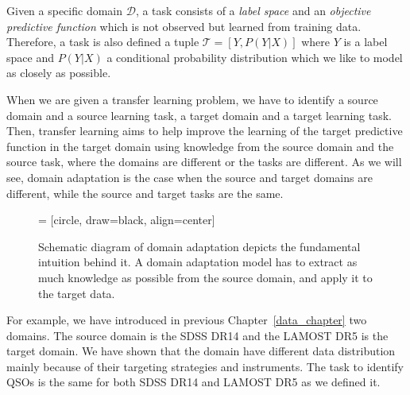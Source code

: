 Given a specific domain \(\mathcal{D}\),
a task consists of a \textit{label space} and an \textit{objective predictive function}
which is not observed but learned from training data.
Therefore, a task is also defined a tuple \(\mathcal{T} = [Y, P(Y | X)]\)
where \(Y\) is a label space
and \(P(Y | X)\) a conditional probability distribution
which we like to model as closely as possible.

When we are given a transfer learning problem,
we have to identify a source domain and a source learning task,
a target domain and a target learning task.
Then, transfer learning aims to help improve the learning of the target predictive function in the target domain
using knowledge from the source domain and the source task,
where the domains are different or the tasks are different.
As we will see, domain adaptation is the case
when the source and target domains are different,
while the source and target tasks are the same.~\cite{pan2010}

\begin{figure}
\begin{center}
 = [circle, draw=black, align=center]
\end{center}
\caption[Schematic depiction of domain adaptation]{
	Schematic diagram of domain adaptation depicts the fundamental intuition behind it.
	A domain adaptation model has to extract as much knowledge as possible from the source domain,
	and apply it to the target data.
	}
\end{figure}

For example, we have introduced in previous Chapter~\ref{data_chapter}
two domains.
The source domain is the SDSS DR14 and the LAMOST DR5 is the target domain.
We have shown that the domain have different data distribution
mainly because of their targeting strategies and instruments.
The task to identify QSOs is the same for both SDSS DR14 and LAMOST DR5
as we defined it.

